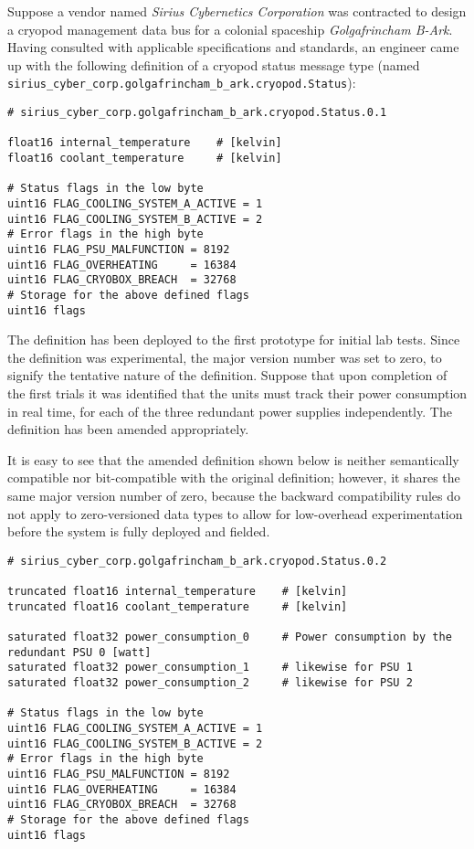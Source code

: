 Suppose a vendor named \emph{Sirius Cybernetics Corporation} was contracted to design a
cryopod management data bus for a colonial spaceship \emph{Golgafrincham B-Ark}.
Having consulted with applicable specifications and standards, an engineer came up with the following
definition of a cryopod status message type (named \verb|sirius_cyber_corp.golgafrincham_b_ark.cryopod.Status|):

\begin{verbatim}
# sirius_cyber_corp.golgafrincham_b_ark.cryopod.Status.0.1

float16 internal_temperature    # [kelvin]
float16 coolant_temperature     # [kelvin]

# Status flags in the low byte
uint16 FLAG_COOLING_SYSTEM_A_ACTIVE = 1
uint16 FLAG_COOLING_SYSTEM_B_ACTIVE = 2
# Error flags in the high byte
uint16 FLAG_PSU_MALFUNCTION = 8192
uint16 FLAG_OVERHEATING     = 16384
uint16 FLAG_CRYOBOX_BREACH  = 32768
# Storage for the above defined flags
uint16 flags
\end{verbatim}

The definition has been deployed to the first prototype for initial lab tests.
Since the definition was experimental, the major version number was set to zero, to signify the
tentative nature of the definition.
Suppose that upon completion of the first trials it was identified that the units must track their power consumption
in real time, for each of the three redundant power supplies independently.
The definition has been amended appropriately.

It is easy to see that the amended definition shown below is neither semantically compatible nor bit-compatible
with the original definition; however, it shares the same major version number of zero, because the backward
compatibility rules do not apply to zero-versioned data types to allow for low-overhead experimentation
before the system is fully deployed and fielded.

\begin{verbatim}
# sirius_cyber_corp.golgafrincham_b_ark.cryopod.Status.0.2

truncated float16 internal_temperature    # [kelvin]
truncated float16 coolant_temperature     # [kelvin]

saturated float32 power_consumption_0     # Power consumption by the redundant PSU 0 [watt]
saturated float32 power_consumption_1     # likewise for PSU 1
saturated float32 power_consumption_2     # likewise for PSU 2

# Status flags in the low byte
uint16 FLAG_COOLING_SYSTEM_A_ACTIVE = 1
uint16 FLAG_COOLING_SYSTEM_B_ACTIVE = 2
# Error flags in the high byte
uint16 FLAG_PSU_MALFUNCTION = 8192
uint16 FLAG_OVERHEATING     = 16384
uint16 FLAG_CRYOBOX_BREACH  = 32768
# Storage for the above defined flags
uint16 flags
\end{verbatim}

